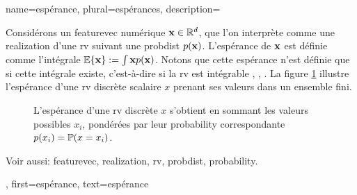 {name={espérance}, plural={espérances},
	description={Considérons un \gls{featurevec} numérique ${\bf x} \in \mathbb{R}^{d}$, 
		que l’on interprète comme une \gls{realization} d’une \gls{rv} suivant une \gls{probdist} $p({\bf x})$. 
		L’espérance de ${\bf x}$ est définie comme l’intégrale $\mathbb{E} \{ {\bf x} \} := \int {\bf x} p({\bf x})$. 
		Notons que cette espérance n’est définie que si cette intégrale existe, c’est-à-dire si la \gls{rv} est intégrable 
		\cite{RudinBookPrinciplesMatheAnalysis}, \cite{BillingsleyProbMeasure}, \cite{HalmosMeasure}. 
		La figure \ref{fig_expect_discrete_dict} illustre l’espérance d’une \gls{rv} discrète scalaire $x$ prenant ses valeurs 
		dans un ensemble fini.
		\begin{figure}[H]
			\begin{center}
			\end{center}
			\vspace*{-5mm}
			\caption{L’espérance d’une \gls{rv} discrète $x$ s’obtient en sommant les valeurs possibles $x_{i}$, pondérées par 
				leur \gls{probability} correspondante $p(x_i) = \mathbb{P}({x= x_i})$. \label{fig_expect_discrete_dict}}
		\end{figure}
		Voir aussi: \gls{featurevec}, \gls{realization}, \gls{rv}, \gls{probdist}, \gls{probability}.},
	first={espérance},
	text={espérance}
}


